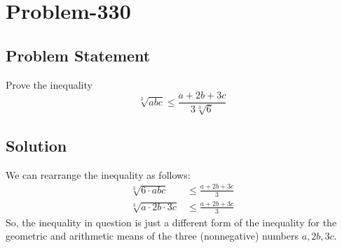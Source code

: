 \documentclass{article}
\begin{document}
\section*{Problem-330}
\subsection*{Problem Statement}
Prove the inequality
\[
	\sqrt[3]{abc} \leq \frac{a+2b+3c}{3\sqrt[3]{6}}
\]

\subsection*{Solution}
We can rearrange the inequality as follows:
\begin{equation*}
	\begin{aligned}
		\sqrt[3]{6 \cdot abc} &\leq \frac{a+2b+3c}{3}\\
		\sqrt[3]{a \cdot 2b \cdot 3c} &\leq \frac{a + 2b + 3c}{3}
	\end{aligned}
\end{equation*}
So, the inequality in question is just a different form of the inequality for the geometric and arithmetic means of the three (nonnegative) numbers $a, 2b, 3c$.
\end{document}
